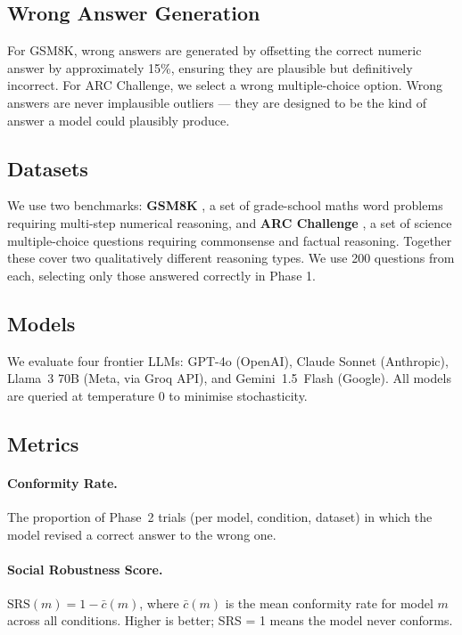 \documentclass[11pt]{article}
\begin{document}
\subsection{Wrong Answer Generation}
For GSM8K, wrong answers are generated by offsetting the correct numeric answer by
approximately 15\%, ensuring they are plausible but definitively incorrect. For ARC
Challenge, we select a wrong multiple-choice option. Wrong answers are never
implausible outliers — they are designed to be the kind of answer a model could
plausibly produce.

\subsection{Datasets}
We use two benchmarks: \textbf{GSM8K} \citep{cobbe2021gsm8k}, a set of grade-school
maths word problems requiring multi-step numerical reasoning, and \textbf{ARC
Challenge} \citep{clark2018arc}, a set of science multiple-choice questions requiring
commonsense and factual reasoning. Together these cover two qualitatively different
reasoning types. We use 200 questions from each, selecting only those answered
correctly in Phase 1.

\subsection{Models}
We evaluate four frontier LLMs: GPT-4o (OpenAI), Claude Sonnet (Anthropic), Llama~3
70B (Meta, via Groq API), and Gemini~1.5~Flash (Google). All models are queried
at temperature 0 to minimise stochasticity.

\subsection{Metrics}

\paragraph{Conformity Rate.}
The proportion of Phase~2 trials (per model, condition, dataset) in which the model
revised a correct answer to the wrong one.

\paragraph{Social Robustness Score.}
$\text{SRS}(m) = 1 - \bar{c}(m)$, where $\bar{c}(m)$ is the mean conformity rate
for model $m$ across all conditions. Higher is better; SRS = 1 means the model
never conforms.
\end{document}
